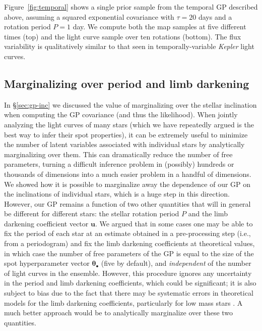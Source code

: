 \documentclass[modern,linenumbers]{aastex62}
\begin{document}
Figure~\ref{fig:temporal} shows a single prior sample from the temporal
GP described above, assuming a squared exponential covariance with $\tau = 20$ days
and a rotation period $P = 1$ day. We compute both the map samples at five
different times (top) and the light curve sample over ten rotations (bottom).
The flux variability is qualitatively similar to that seen in
temporally-variable \emph{Kepler} light curves.

\subsection{Marginalizing over period and limb darkening}
\label{sec:other-marg}

In \S\ref{sec:gp-inc} we discussed the value of marginalizing over the
stellar inclination when computing the GP covariance (and thus the likelihood).
When jointly analyzing the light curves of many stars (which we have repeatedly
argued is the best way to infer their spot properties), it can be extremely useful to
minimize the number of latent variables associated with individual stars by
analytically marginalizing over them. This can dramatically reduce the number
of free parameters, turning a difficult inference problem in (possibly) hundreds
or thousands of dimensions into a much easier problem in a handful of dimensions.
We showed how it is possible to marginalize away the dependence of our GP on
the inclinations of individual stars, which is a huge step in this direction.
However, our GP remains a function of two other quantities that will in general
be different for different stars: the stellar rotation period $P$ and the
limb darkening coefficient vector $\mathbf{u}$. We argued that in some cases
one may be able to fix the period of each star at an estimate obtained in a pre-processing
step (i.e., from a periodogram) and fix the limb darkening coefficients at
theoretical values, in which case the number of free parameters of the GP
is equal to the size of the spot hyperparameter vector $\pmb{\theta}_\bullet$
(five by default), and \emph{independent} of the number of light curves in
the ensemble.
%
However, this procedure ignores any uncertainty in the period and limb darkening
coefficients, which could be significant; it is also subject to bias due to
the fact that there may be systematic errors in theoretical models for the limb darkening
coefficients, particularly for low mass stars \citep[e.g.,][]{Kervella2017}. A much better
approach would be to analytically marginalize over these two quantities.
\end{document}
